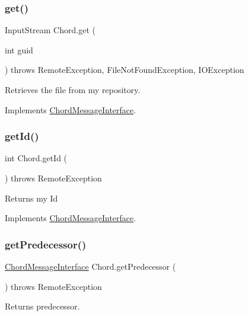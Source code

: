 \subsubsection{\texorpdfstring{get()}{get()}}
{\footnotesize\ttfamily Input\+Stream Chord.\+get (\begin{DoxyParamCaption}\item[{int}]{guid }\end{DoxyParamCaption}) throws Remote\+Exception, File\+Not\+Found\+Exception, I\+O\+Exception}



Retrieves the file from my repository. 



Implements \hyperlink{interface_chord_message_interface_a4cdb461c48fe643f4fb5fa420d017eb3}{Chord\+Message\+Interface}.

\hypertarget{class_chord_a7c6a50aff653bafc040f923c93061bdb}{}\label{class_chord_a7c6a50aff653bafc040f923c93061bdb} 
\subsubsection{\texorpdfstring{get\+Id()}{getId()}}
{\footnotesize\ttfamily int Chord.\+get\+Id (\begin{DoxyParamCaption}{ }\end{DoxyParamCaption}) throws Remote\+Exception}

Returns my Id 

Implements \hyperlink{interface_chord_message_interface_acead95d9a7196f05b656462ab78138eb}{Chord\+Message\+Interface}.

\hypertarget{class_chord_a3f1aadce3820e808c80662bb61a58e34}{}\label{class_chord_a3f1aadce3820e808c80662bb61a58e34} 
\subsubsection{\texorpdfstring{get\+Predecessor()}{getPredecessor()}}
{\footnotesize\ttfamily \hyperlink{interface_chord_message_interface}{Chord\+Message\+Interface} Chord.\+get\+Predecessor (\begin{DoxyParamCaption}{ }\end{DoxyParamCaption}) throws Remote\+Exception}



Returns predecessor. 



